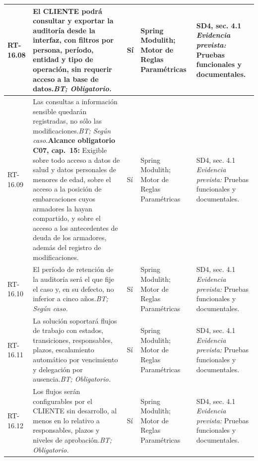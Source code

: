 \begin{paginaHorizontalSynaptix}
\begin{longtable}{|L{0.09\AnchoMatrizTDoce}|L{0.385\AnchoMatrizTDoce}|L{0.065\AnchoMatrizTDoce}|L{0.18\AnchoMatrizTDoce}|L{0.28\AnchoMatrizTDoce}|}
RT-\allowbreak{}16.\allowbreak{}08 &
El CLIENTE podrá consultar y exportar la auditoría desde la interfaz, con filtros por persona, período, entidad y tipo de operación, sin requerir acceso a la base de datos.\newline\textit{BT; Obligatorio.} &
Sí &
Spring Modulith; Motor de Reglas Paramétricas &
SD4, sec. 4.1 \newline\textit{Evidencia prevista:} Pruebas funcionales y documentales. \\ \hline

RT-\allowbreak{}16.\allowbreak{}09 &
Las consultas a información sensible quedarán registradas, no sólo las modificaciones.\newline\textit{BT; Según caso.}\newline\textbf{Alcance obligatorio C07, cap.~15:} Exigible sobre todo acceso a datos de salud y datos personales de menores de edad, sobre el acceso a la posición de embarcaciones cuyos armadores la hayan compartido, y sobre el acceso a los antecedentes de deuda de los armadores, además del registro de modificaciones. &
Sí &
Spring Modulith; Motor de Reglas Paramétricas &
SD4, sec. 4.1 \newline\textit{Evidencia prevista:} Pruebas funcionales y documentales. \\ \hline

RT-\allowbreak{}16.\allowbreak{}10 &
El período de retención de la auditoría será el que fije el caso y, en su defecto, no inferior a cinco años.\newline\textit{BT; Según caso.} &
Sí &
Spring Modulith; Motor de Reglas Paramétricas &
SD4, sec. 4.1 \newline\textit{Evidencia prevista:} Pruebas funcionales y documentales. \\ \hline

RT-\allowbreak{}16.\allowbreak{}11 &
La solución soportará flujos de trabajo con estados, transiciones, responsables, plazos, escalamiento automático por vencimiento y delegación por ausencia.\newline\textit{BT; Obligatorio.} &
Sí &
Spring Modulith; Motor de Reglas Paramétricas &
SD4, sec. 4.1 \newline\textit{Evidencia prevista:} Pruebas funcionales y documentales. \\ \hline

RT-\allowbreak{}16.\allowbreak{}12 &
Los flujos serán configurables por el CLIENTE sin desarrollo, al menos en lo relativo a responsables, plazos y niveles de aprobación.\newline\textit{BT; Obligatorio.} &
Sí &
Spring Modulith; Motor de Reglas Paramétricas &
SD4, sec. 4.1 \newline\textit{Evidencia prevista:} Pruebas funcionales y documentales. \\ \hline


\end{longtable}
\end{paginaHorizontalSynaptix}
